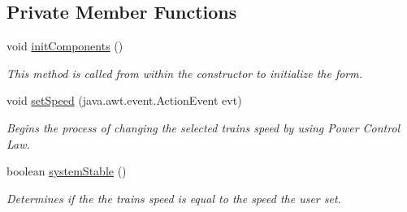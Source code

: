 \subsection*{Private Member Functions}
\begin{DoxyCompactItemize}
\item 
void \hyperlink{classTrainControllerComps_1_1TCSpeedController_a2b6b810eeb4e36a5932b6c26babfd7a2}{init\+Components} ()
\begin{DoxyCompactList}\small\item\em This method is called from within the constructor to initialize the form. \end{DoxyCompactList}\item 
void \hyperlink{classTrainControllerComps_1_1TCSpeedController_a85b0846fba0d3db24f1719437ad854d9}{set\+Speed} (java.\+awt.\+event.\+Action\+Event evt)
\begin{DoxyCompactList}\small\item\em Begins the process of changing the selected train\textquotesingle{}s speed by using Power Control Law. \end{DoxyCompactList}\item 
boolean \hyperlink{classTrainControllerComps_1_1TCSpeedController_a1a67c88e2bbc9543cfe1a910c7cab35f}{system\+Stable} ()
\begin{DoxyCompactList}\small\item\em Determines if the the train\textquotesingle{}s speed is equal to the speed the user set. \end{DoxyCompactList}\end{DoxyCompactItemize}
